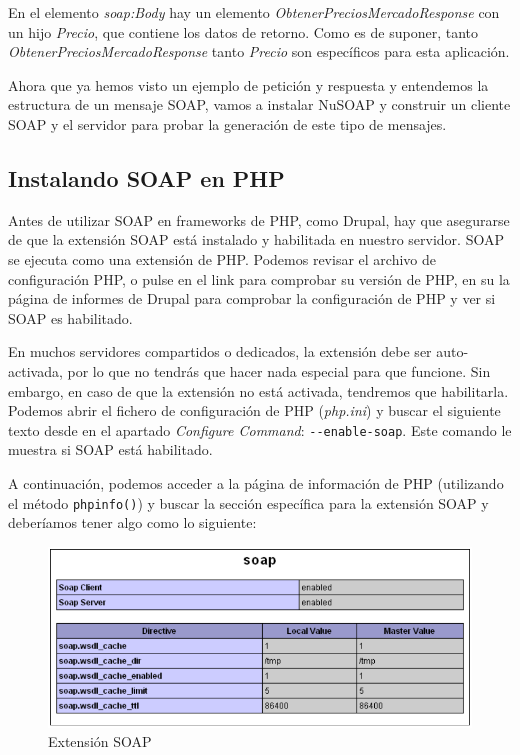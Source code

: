 En el elemento \textit{soap:Body} hay un elemento \textit{ObtenerPreciosMercadoResponse} con un hijo \textit{Precio}, 
que contiene los datos de retorno. Como es de suponer, tanto \textit{ObtenerPreciosMercadoResponse} tanto \textit{Precio} 
son específicos para esta aplicación.
 
Ahora que ya hemos visto un ejemplo de petición y respuesta y entendemos la estructura de un mensaje SOAP, 
vamos a instalar NuSOAP y construir un cliente SOAP y el servidor para probar la generación de este tipo de 
mensajes.

\subsection{\large{Instalando SOAP en PHP}}

Antes de utilizar SOAP en frameworks de PHP, como Drupal, hay que asegurarse de que la extensión SOAP 
está instalado y habilitada en nuestro servidor. SOAP se ejecuta como una extensión de PHP. Podemos revisar 
el archivo de configuración PHP, o pulse en el link para comprobar su versión de PHP, en su la página de 
informes de Drupal para comprobar la configuración de PHP y ver si SOAP es habilitado. 

En muchos servidores compartidos o dedicados, la extensión debe ser auto-activada, por lo que no tendrás que 
hacer nada especial para que funcione. Sin embargo, en caso de que la extensión no está activada, tendremos que habilitarla.
Podemos abrir el fichero de configuración de PHP (\textit{php.ini}) y buscar el siguiente texto desde en el apartado 
\textit{Configure Command}: \verb|--enable-soap|. Este comando le muestra si SOAP está habilitado. 

A continuación, podemos acceder a la página de información de PHP (utilizando el método \verb|phpinfo()|) y 
buscar la sección específica para la extensión SOAP y deberíamos tener algo como lo siguiente:

\begin{figure}
  \centering
    \includegraphics[width=1\textwidth]{Assets/Soap/Imagenes/phpinfo.png}
  \caption{Extensión SOAP}
\end{figure}

